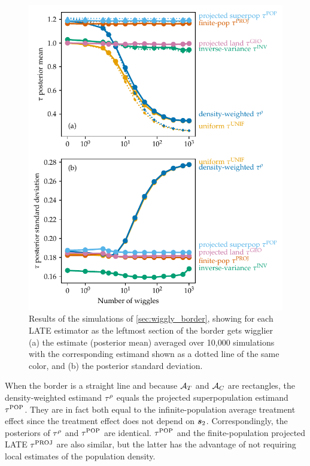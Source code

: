 \begin{figure}[!tb]
    \centering
    \includegraphics[height=0.6\textheight]{figures/wiggly_boundaries_posteriors.pdf}
    \caption{
        \label{fig:wiggly_boundaries_posteriors}
        Results of the simulations of \autoref{sec:wiggly_border}, showing for each LATE estimator as the leftmost section of the border gets wigglier (a) the estimate (posterior mean) averaged over 10,000 simulations with the corresponding estimand shown as a dotted line of the same color, and (b) the posterior standard deviation.
    }
\end{figure}

    When the border is a straight line and because \(\mathcal{A}{}_{T}\) and \(\mathcal{A}{}_{C}\) are rectangles, the density-weighted estimand \(\tau^{\rho}\) equals the projected superpopulation estimand \(\tau^{\mathrm{POP}}\).
They are in fact both equal to the infinite-population average treatment effect since the treatment effect does not depend on \(\bm{s}_2\).
Correspondingly, the posteriors of \(\tau^{\rho}\) and \(\tau^{\mathrm{POP}}\) are identical.
\(\tau^{\mathrm{POP}}\) and the finite-population projected LATE \(\tau^{\mathrm{PROJ}}\) are also similar, but the latter has the advantage of not requiring local estimates of the population density.

